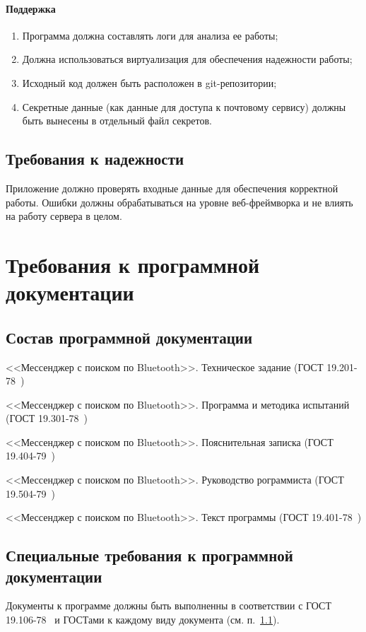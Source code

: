 \documentclass[testmethods]{espd}
\begin{document}
\paragraph{Поддержка}

\begin{enumerate}
\item Программа должна составлять логи для анализа ее работы;
\item Должна использоваться виртуализация для обеспечения надежности работы;
\item Исходный код должен быть расположен в git-репозитории;
\item Секретные данные (как данные для доступа к почтовому сервису) должны быть вынесены в отдельный файл секретов.
\end{enumerate}

\subsection{Требования к надежности}
Приложение должно проверять входные данные для обеспечения корректной работы. Ошибки должны обрабатываться на уровне веб-фреймворка и не влиять на работу сервера в целом.

\section{Требования к программной документации}
\subsection{Состав программной документации}\label{subsection:documentation}
<<Мессенджер с поиском по Bluetooth>>. Техническое задание (ГОСТ 19.201-78~\cite{espd201})

<<Мессенджер с поиском по Bluetooth>>. Программа и методика испытаний (ГОСТ 19.301-78~\cite{espd301})

<<Мессенджер с поиском по Bluetooth>>. Пояснительная записка (ГОСТ 19.404-79~\cite{espd404})

<<Мессенджер с поиском по Bluetooth>>. Руководство рограммиста (ГОСТ 19.504-79~\cite{espd505})

<<Мессенджер с поиском по Bluetooth>>. Текст программы (ГОСТ 19.401-78~\cite{espd401})

\subsection{Специальные требования к программной документации}
Документы к программе должны быть выполненны в соответствии с ГОСТ 19.106-78~\cite{espd106} и ГОСТами к каждому виду документа (см. п.~\ref{subsection:documentation}).
\end{document}
